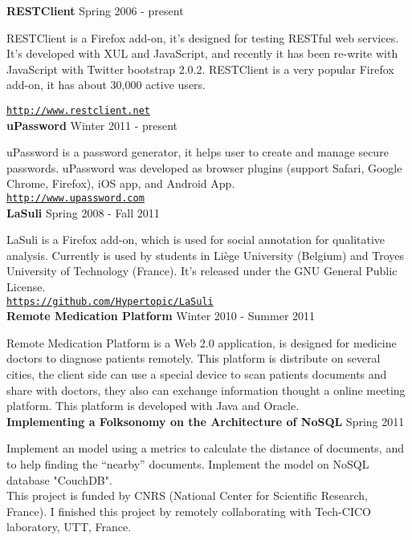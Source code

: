 \documentclass[10pt]{article}
\newcommand{\halfblankline}{\quad\vspace{-0.5\baselineskip}\pagebreak[3]}
\providecommand*\url[1]{\href{#1}{#1}}
\renewcommand*\url[1]{\href{#1}{\texttt{#1}}}
\begin{document}
\textbf{RESTClient}
\hfill Spring 2006 - present

\halfblankline

RESTClient is a Firefox add-on, it's designed for testing RESTful web services. It's developed with XUL and JavaScript, and recently it has been re-write with JavaScript with Twitter bootstrap 2.0.2. RESTClient is a very popular Firefox add-on, it has about 30,000 active users.

\halfblankline

\url{http://www.restclient.net} \\


\textbf{uPassword}
\hfill Winter 2011 - present

\halfblankline

uPassword is a password generator, it helps user to create and manage secure passwords. uPassword was developed as browser plugins (support Safari, Google Chrome, Firefox),  iOS app, and Android App. \\
\url{http://www.upassword.com} \\


\textbf{LaSuli}
\hfill Spring 2008 - Fall 2011

\halfblankline

LaSuli is a Firefox add-on, which is used for social annotation for qualitative analysis. Currently is used by students in Liège University (Belgium) and Troyes University of Technology (France). It's released under the GNU General Public License.\\
\url{https://github.com/Hypertopic/LaSuli}\\

\textbf{Remote Medication Platform}
\hfill Winter 2010 - Summer 2011

\halfblankline

Remote Medication Platform is a Web 2.0 application, is designed for medicine doctors to diagnose patients remotely. This platform is distribute on several cities, the client side can use a special device to scan patients documents and share with doctors, they also can exchange information thought a online meeting platform. This platform is developed with Java and Oracle.\\


\textbf{Implementing a Folksonomy on the Architecture of NoSQL}
\hfill Spring 2011

\halfblankline

Implement an model using a metrics to calculate the distance of documents, and to help finding the “nearby” documents. Implement the model on NoSQL database "CouchDB".\\
This project is funded by CNRS (National Center for Scientific Research, France). I finished this project by remotely collaborating with Tech-CICO laboratory, UTT, France. \\
\end{document}
